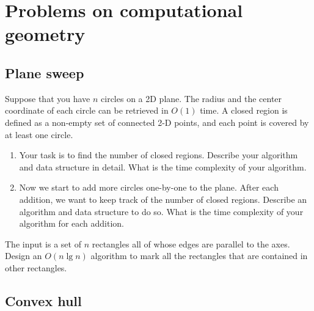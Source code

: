 \chapter{Problems on computational geometry}
\begin{refsection}

\section{Plane sweep}
\begin{Exercise}
Suppose that you have $n$ circles on a 2D plane. The radius and the center coordinate of each circle can be retrieved in $O(1)$ time. A closed region is defined as a non-empty set of connected 2-D points, and each point is covered by at least one circle.
\begin{enumerate}
\item Your task is to find the number of closed regions. Describe your algorithm and data structure in detail. What is the time complexity of your algorithm.
\item Now we start to add more circles one-by-one to the plane. After each addition, we want to keep track of the number of closed regions. Describe an algorithm and data structure to do so. What is the time complexity of your algorithm for each addition. 
\end{enumerate}
\end{Exercise}
\begin{Answer}
\end{Answer}

\begin{Exercise}
The input is a set of $n$ rectangles all of whose edges are parallel to the axes. Design an $O(n \lg n)$ algorithm to mark all the rectangles that are contained in other rectangles. 
\end{Exercise}
\begin{Answer}
\end{Answer}


\section{Convex hull}


\end{refsection}
